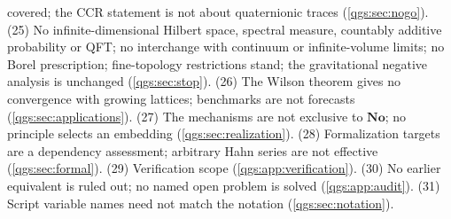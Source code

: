 \documentclass[11pt,oneside]{article}
\numberwithin{equation}{section}
\theoremstyle{plain}
\theoremstyle{definition}
\theoremstyle{remark}
\newcommand{\No}{\mathbf{No}}
\begin{document}
covered; the CCR statement is not about quaternionic traces (\cref{qgs:sec:nogo}). (25) No infinite-dimensional Hilbert space, spectral measure, countably additive probability or QFT; no interchange with continuum or infinite-volume limits; no Borel prescription; fine-topology restrictions stand; the gravitational negative analysis is unchanged (\cref{qgs:sec:stop}). (26) The Wilson theorem gives no convergence with growing lattices; benchmarks are not forecasts (\cref{qgs:sec:applications}). (27) The mechanisms are not exclusive to $\No$; no principle selects an embedding (\cref{qgs:sec:realization}). (28) Formalization targets are a dependency assessment; arbitrary Hahn series are not effective (\cref{qgs:sec:formal}). (29) Verification scope (\cref{qgs:app:verification}). (30) No earlier equivalent is ruled out; no named open problem is solved (\cref{qgs:app:audit}). (31) Script variable names need not match the notation (\cref{qgs:sec:notation}).
\end{document}
